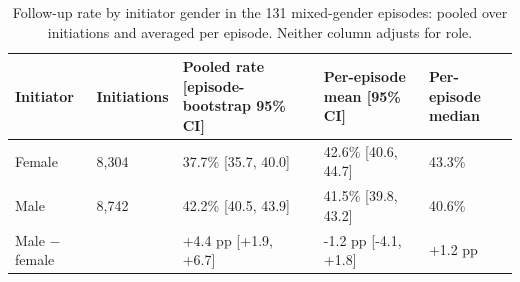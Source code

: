 \begin{table}[htbp]
\centering
\small
\caption{Follow-up rate by initiator gender in the 131 mixed-gender episodes: pooled over initiations and averaged per episode. Neither column adjusts for role.}
\label{tab:table10_corrected}
\begin{tabular}{lllll}
\toprule
Initiator & Initiations & Pooled rate [episode-bootstrap 95\% CI] & Per-episode mean [95\% CI] & Per-episode median \\
\midrule
Female & 8,304 & 37.7\% [35.7, 40.0] & 42.6\% [40.6, 44.7] & 43.3\% \\
Male & 8,742 & 42.2\% [40.5, 43.9] & 41.5\% [39.8, 43.2] & 40.6\% \\
Male $-$ female &  & +4.4 pp [+1.9, +6.7] & -1.2 pp [-4.1, +1.8] & +1.2 pp \\
\bottomrule
\end{tabular}
\end{table}
